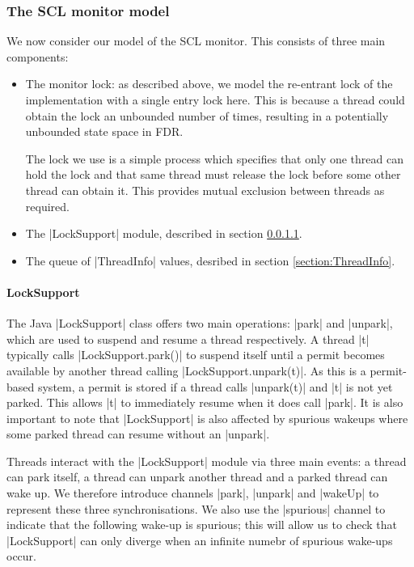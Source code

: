 \subsubsection{The SCL monitor model}


We now consider our model of the SCL monitor. This consists of three main components: 
\begin{itemize}
  \item The monitor lock: as described above, we model the re-entrant lock of the implementation with a single entry lock here. This is because a thread could obtain the lock an unbounded number of times, resulting in a potentially unbounded state space in FDR. 
  
  The lock we use is a simple process  which specifies that only one thread can hold the lock and that same thread must release the lock before some other thread can obtain it. This provides mutual exclusion between threads as required.
  \item The |LockSupport| module, described in section \ref{section:LockSupport}.
  \item The queue of |ThreadInfo| values, desribed in section \ref{section:ThreadInfo}.
\end{itemize}

\paragraph{LockSupport}\label{section:LockSupport}

The Java |LockSupport| \cite{LockSupport} class offers two main operations: |park| and |unpark|, which are used to suspend and resume a thread respectively. A thread |t| typically calls |LockSupport.park()| to suspend itself until a permit becomes available by another thread calling |LockSupport.unpark(t)|. As this is a permit-based system, a permit is stored if a thread calls |unpark(t)| and |t| is not yet parked. This allows |t| to immediately resume when it does call |park|.
It is also important to note that |LockSupport| is also affected by spurious wakeups where some parked thread can resume without an |unpark|. 

Threads interact with the |LockSupport| module via three main events: a thread can park itself, a thread can unpark another thread and a parked thread can wake up. We therefore introduce channels |park|, |unpark| and |wakeUp| to represent these three synchronisations. We also use the |spurious| channel to indicate that the following wake-up is spurious; this will allow us to check that |LockSupport| can only diverge when an infinite numebr of spurious wake-ups occur.


